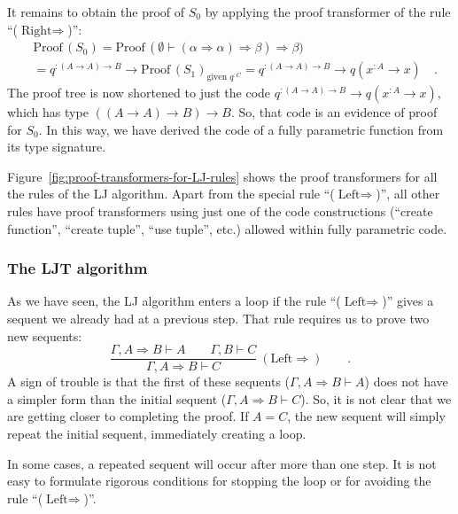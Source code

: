 It remains to obtain the proof of $S_{0}$ by applying the proof transformer
of the rule \textsf{``}($\text{Right}\Rightarrow$)\textsf{''}:
\begin{align*}
 & \text{Proof}\,(S_{0})=\text{Proof}\,(\emptyset\vdash(\alpha\Rightarrow\alpha)\Rightarrow\beta)\Rightarrow\beta)\\
 & =q^{:(A\rightarrow A)\rightarrow B}\rightarrow\text{Proof}\,(S_{1})_{\text{given }q^{:C}}=q^{:(A\rightarrow A)\rightarrow B}\rightarrow q(x^{:A}\rightarrow x)\quad.
\end{align*}
The proof tree is now shortened to just the code $q^{:(A\rightarrow A)\rightarrow B}\rightarrow q(x^{:A}\rightarrow x)$,
which has type $\left(\left(A\rightarrow A\right)\rightarrow B\right)\rightarrow B$.
So, that code is an evidence of proof for $S_{0}$. In this way, we
have derived the code of a fully parametric function from its type
signature.

Figure~\ref{fig:proof-transformers-for-LJ-rules} shows the proof
transformers for all the rules of the LJ algorithm. Apart from the
special rule \textsf{``}($\text{Left}\Rightarrow$)\textsf{''}, all other rules have
proof transformers using just one of the code constructions (\textsf{``}create
function\textsf{''}, \textsf{``}create tuple\textsf{''}, \textsf{``}use tuple\textsf{''}, etc.) allowed within
fully parametric code.

\subsubsection*{The LJT algorithm}

As we have seen, the LJ algorithm enters a loop if the rule \textsf{``}($\text{Left}\Rightarrow$)\textsf{''}
gives a sequent we already had at a previous step. That rule requires
us to prove two new sequents:
\[
\frac{\Gamma,A\Rightarrow B\vdash A\quad\quad\Gamma,B\vdash C}{\Gamma,A\Rightarrow B\vdash C}~(\text{Left}\Rightarrow)\quad\quad.
\]
A sign of trouble is that the first of these sequents ($\Gamma,A\Rightarrow B\vdash A$)
does not have a simpler form than the initial sequent ($\Gamma,A\Rightarrow B\vdash C$).
So, it is not clear that we are getting closer to completing the proof.
If $A=C$, the new sequent will simply repeat the initial sequent,
immediately creating a loop.

In some cases, a repeated sequent will occur after more than one step.
It is not easy to formulate rigorous conditions for stopping the loop
or for avoiding the rule \textsf{``}($\text{Left}\Rightarrow$)\textsf{''}.

